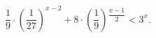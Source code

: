 \begin{ex}[type=inequality]
	\begin{condition}
		$ \dfrac{1}{9}\cdot\left(\dfrac{1}{27}\right)^{x - 2} + 8\cdot\left(\dfrac{1}{9}\right)$\tiny$^{\dfrac{x - 1}{2}}$\normalsize$<3^x .$
	\end{condition}
\end{ex}
